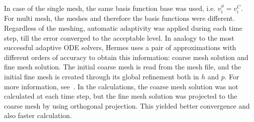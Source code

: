 In case of the single mesh, the same basis function base was used, i.e.
$v_i^\phi=v_i^C$. For multi mesh, the meshes and therefore the basis functions
were different. Regardless of the meshing, automatic adaptivity was applied
during each time step, till the error converged to the acceptable level.
In analogy to the most successful adaptive ODE solvers, Hermes uses a pair of 
approximations with different orders of accuracy to obtain this information: 
coarse mesh solution and fine mesh solution. The initial coarse mesh is read 
from the mesh file, and the initial fine mesh is created through its 
global refinement both in $h$ and $p$. For more
information, see~\cite{Hermes-project}. In the calculations, the coarse
mesh solution was not calculated at each time step, but the fine mesh
solution was projected to the coarse mesh by using orthogonal projection. This
yielded better convergence and also faster calculation.

